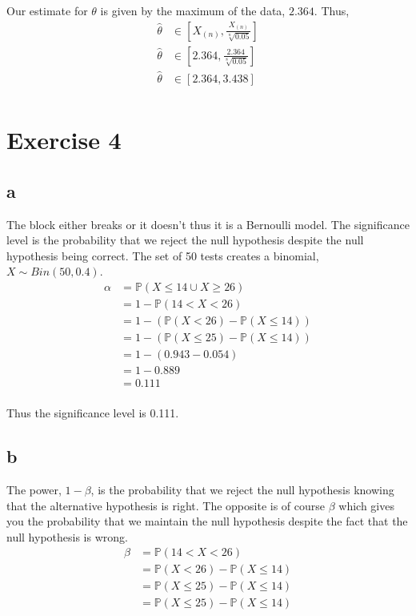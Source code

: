 \documentclass{article}
\newcommand{\prob}{\mathbb{P}}
\begin{document}
Our estimate for $\theta$ is given by the maximum of the data, $2.364$. Thus,
\begin{align*}
    \hat{\theta} &\in \left[X_{(n)}, \frac{X_{(n)}}{\sqrt[n]{0.05}}\right] \\
    \hat{\theta} &\in \left[2.364, \frac{2.364}{\sqrt[8]{0.05}}\right] \\
    \hat{\theta} &\in \left[2.364, 3.438\right] \\
\end{align*}

\section{Exercise 4}
\subsection{a}
The block either breaks or it doesn't thus it is a Bernoulli model.
The significance level is the probability that we reject the null hypothesis
despite the null hypothesis being correct.
The set of 50 tests creates a binomial, $X \sim Bin(50,0.4)$.
\begin{align*}
    \alpha &= \prob(X \leq 14 \cup X \geq 26) \\
    &= 1 - \prob(14 < X < 26) \\
    &= 1 - \left(\prob(X < 26) - \prob(X \leq 14)\right) \\
    &= 1 - \left(\prob(X \leq 25) - \prob(X \leq 14)\right) \\
    &= 1 - \left(0.943 - 0.054\right) \\
    &= 1 - 0.889 \\
    &= 0.111 \\
\end{align*}

Thus the significance level is 0.111.

\subsection{b}
The power, $1-\beta$, is the probability that we reject the null hypothesis
knowing that the alternative hypothesis is right. The opposite is of course 
$\beta$ which gives you the probability that we maintain the null hypothesis
despite the fact that the null hypothesis is wrong.
\begin{align*}
    \beta &= \prob(14 < X < 26) \\
    &= \prob(X < 26) - \prob(X \leq 14) \\
    &= \prob(X \leq 25) - \prob(X \leq 14) \\
    &= \prob(X \leq 25) - \prob(X \leq 14) \\
\end{align*}
\end{document}
